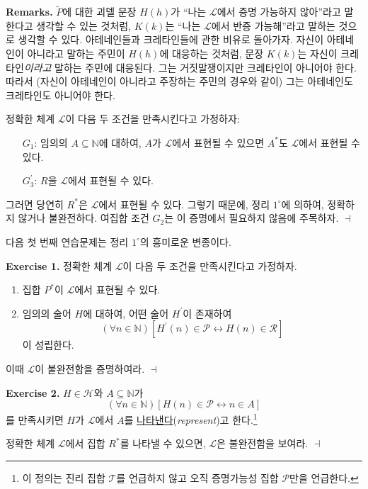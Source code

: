 \documentclass[12pt]{paper}
\newenvironment{context}[1][]
{ \noindent \textbf{{#1}.} }
{ \hfill $ \dashv $ }
\begin{document}
\begin{context}[Remarks]
$\widetilde{P}$에 대한 괴델 문장 $H \left( h \right)$가 ``나는 $\mathcal{L}$에서 증명 가능하지 않아''라고 말한다고 생각할 수 있는 것처럼,
$K \left( k \right)$는 ``나는 $\mathcal{L}$에서 반증 가능해''라고 말하는 것으로 생각할 수 있다.
아테네인들과 크레타인들에 관한 비유로 돌아가자.
자신이 아테네인이 아니라고 말하는 주민이 $H \left( h \right)$에 대응하는 것처럼,
문장 $K \left( k \right)$는 자신이 크레타인\textit{이라고} 말하는 주민에 대응된다.
그는 거짓말쟁이지만 크레타인이 아니어야 한다.
따라서 (자신이 아테네인이 아니라고 주장하는 주민의 경우와 같이) 그는 아테네인도 크레타인도 아니어야 한다.

정확한 체계 $\mathcal{L}$이 다음 두 조건을 만족시킨다고 가정하자:
\begin{itemize}
\item[$G_{1}$:] 임의의 $A \subseteq \mathbb{N}$에 대하여, $A$가 $\mathcal{L}$에서 표현될 수 있으면 $A^{*}$도 $\mathcal{L}$에서 표현될 수 있다.
\item[$G_{3}^{\prime}$:] $R$을 $\mathcal{L}$에서 표현될 수 있다.
\end{itemize}

그러면 당연히 $R^{*}$은 $\mathcal{L}$에서 표현될 수 있다.
그렇기 때문에, 정리 $1^{\circ}$에 의하여, 정확하지 않거나 불완전하다.
여집합 조건 $G_{2}$는 이 증명에서 필요하지 않음에 주목하자.
\end{context}

다음 첫 번째 연습문제는 정리 $1^{\circ}$의 흥미로운 변종이다.

\begin{context}[Exercise 1]
정확한 체계 $\mathcal{L}$이 다음 두 조건을 만족시킨다고 가정하자.
\begin{enumerate}
\item 집합 $P^{*}$이 $\mathcal{L}$에서 표현될 수 있다.
\item 임의의 술어 $H$에 대하여, 어떤 술어 $H^{\prime}$이 존재하여 $$\left( \forall n \in \mathbb{N} \right) \left[ H^{\prime} \left( n \right) \in \mathcal{P} \leftrightarrow H \left( n \right) \in \mathcal{R} \right]$$이 성립한다.
\end{enumerate}

이때 $\mathcal{L}$이 불완전함을 증명하여라.
\end{context}

\begin{context}[Exercise 2]
$H \in \mathcal{H}$와 $A \subseteq \mathbb{N}$가
$$ \left( \forall n \in \mathbb{N} \right) \left[ H \left( n \right) \in \mathcal{P} \leftrightarrow n \in A \right] $$를 만족시키면
$H$가 $\mathcal{L}$에서 $A$를 \underline{나타낸다}(\textit{represent})고 한다.\footnote
{
이 정의는 진리 집합 $\mathcal{T}$를 언급하지 않고 오직 증명가능성 집합 $\mathcal{P}$만을 언급한다.
}

정확한 체계 $\mathcal{L}$에서 집합 $R^{*}$를 나타낼 수 있으면, $\mathcal{L}$은 불완전함을 보여라.
\end{context}
\end{document}
